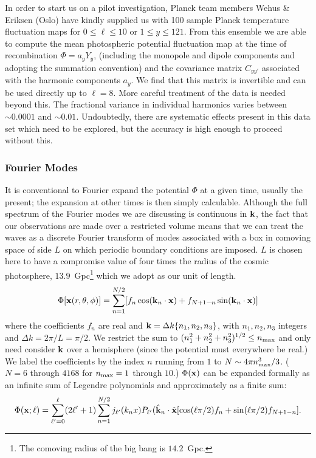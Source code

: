\documentclass[psfig,11pt]{article}
\begin{document}
In order to start us on a pilot investigation, Planck team members Wehus \& Eriksen  (Oslo) have kindly supplied us with 100 sample Planck temperature fluctuation maps for $0\le\ell\le10$ or $1\le y\le121$. From this ensemble we are able to compute the mean photospheric potential fluctuation map at the time of recombination $\Phi=a_yY_y$, (including the monopole and dipole components and adopting the summation convention) and the covariance matrix $C_{yy'}$ associated with the harmonic components $a_y$. We find that this matrix is invertible and can be used directly up to $\ell=8$. More careful treatment of the data is needed beyond this. The fractional variance in individual harmonics varies between $\sim0.0001$ and $\sim0.01$. Undoubtedly, there are systematic effects present in this data set which need to be explored, but the accuracy is high enough to proceed without this.

\subsubsection{Fourier Modes}

It is conventional to Fourier expand the potential $\Phi$ at a given time, usually the present; the expansion at other times is then simply calculable. Although the full spectrum of the Fourier modes we are discussing is continuous in ${\bf k}$, the fact that our observations are made over a restricted volume means that we can treat the waves as a discrete Fourier transform of modes associated with a box in comoving space of side $L$ on which periodic boundary conditions are imposed. $L$ is chosen here to have a compromise value of four times the radius of the cosmic photosphere, $13.9$~Gpc\footnote{The comoving radius of the big bang is $14.2$~Gpc.} which we adopt as our unit of length.
\begin{equation}
\Phi[{\bf x}(r,\theta,\phi)]=\sum_{n=1}^{N/2}[f_n\cos({\bf k}_n\cdot{\bf x})+f_{N+1-n}\sin({\bf k}_n\cdot{\bf x})]
\end{equation}
where the coefficients $f_n$ are real and ${\bf k}=\Delta k\{n_1,n_2,n_3\}$, with $n_1,n_2,n_3$ integers and $\Delta k=2\pi/L=\pi/2$.  We restrict the sum to $(n_1^2+n_2^2+n_3^2)^{1/2}\le n_{\rm max}$ and only need consider $\bf k$ over a hemisphere (since the potential must everywhere be real.) We label the coefficients by the index $n$ running from $1$ to $N\sim4\pi n_{\rm max}^3/3$. ($N=6$ through $4168$ for $n_{\rm max}=1$ through $10$.) $\Phi({\bf x})$ can be expanded formally as an infinite sum of Legendre polynomials and approximately as a finite sum:
\begin{equation}
\Phi({\bf x;\ell})=\sum_{\ell'=0} ^\ell(2\ell'+1)\sum_{n=1}^{N/2}j_{\ell'}(k_nx)P_{\ell'}({\hat{\bf k}}_n\cdot{\hat{\bf x}}[\cos(\ell\pi/2)f_n+\sin(\ell\pi/2)f_{N+1-n}].
\end{equation}
\end{document}
